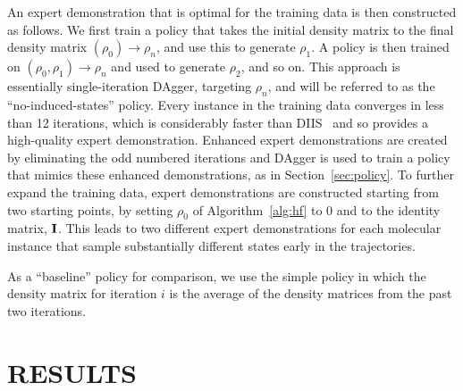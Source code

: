 \documentclass[twoside,11pt]{article}
\begin{document}
An expert demonstration that is optimal for the training data is then constructed as follows. We first train a policy that takes the initial density matrix to the final density matrix $(\rho_0) \rightarrow \rho_n$, and use this to generate $\rho_1$. A policy is then trained on $(\rho_0, \rho_1) \rightarrow \rho_n$ and used to generate $\rho_2$, and so on. This approach is essentially single-iteration DAgger, targeting $\rho_n$, and will be referred to as the ``no-induced-states'' policy. Every instance in the training data converges in less than 12 iterations, which is considerably faster than DIIS~\cite{Pulay1980} and so provides a high-quality expert demonstration. Enhanced expert demonstrations are created by eliminating the odd numbered iterations and DAgger is used to train a policy that mimics these enhanced demonstrations, as in Section~\ref{sec:policy}. To further expand the training data, expert demonstrations are constructed starting from two starting points, by setting $\rho_0$ of Algorithm~\ref{alg:hf} to 0 and to the identity matrix, ${\bf I}$. This leads to two different expert demonstrations for each molecular instance that sample substantially different states early in the trajectories. 

As a ``baseline'' policy for comparison, we use the simple policy in which the density matrix for iteration $i$ is the average of the density matrices from the past two iterations.

\section{RESULTS}
\end{document}
